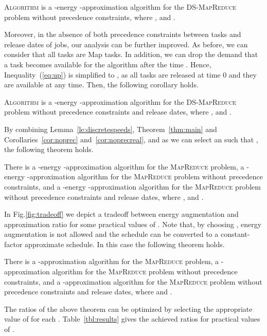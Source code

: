 \documentclass{llncs}
\newcommand{\mr}{\textsc{MapReduce}\xspace}
\newcommand{\dmr}{\textsc{DS-MapReduce}\xspace}
\newcommand{\algomr}{\textsc{Algorithm} \xspace}
\begin{document}
\begin{corollary} \label{cor:noprec}
\algomr is a -energy -approximation algorithm for the \dmr problem without precedence constraints,
where ,  and .
\end{corollary}

Moreover, in the absence of both precedence constraints between tasks and release dates of jobs, our analysis can be further improved.
As before, we can consider that all tasks are Map tasks.
In addition, we can drop the demand that a task  becomes available for the algorithm after the time .
Hence, Inequality~(\ref{eq:up}) is simplified to ,
as all tasks are released at time 0 and they are available at any time.
Then, the following corollary holds.

\begin{corollary} \label{cor:noprecreal}
\algomr is a -energy -approximation algorithm
for the \dmr problem without precedence constraints and release dates,
where ,  and .
\end{corollary}

By combining Lemma~\ref{le:discretespeeds}, Theorem~\ref{thm:main} and Corollaries~\ref{cor:noprec} and~\ref{cor:noprecreal},
and as we can select an  such that , the following theorem holds.

\begin{theorem}
There is a -energy -approximation algorithm for the \mr problem,
a -energy -approximation algorithm for the \mr problem without precedence constraints,
and a -energy -approximation algorithm for the \mr problem without precedence constraints and release dates,
where ,  and .
\end{theorem}

In Fig.\ref{fig:tradeoff} we depict a tradeoff between energy augmentation and approximation ratio for some practical values of .
Note that, by choosing , energy augmentation is not allowed and the schedule can be converted to a constant-factor approximate schedule.
In this case the following theorem holds.

\begin{theorem}
There is a -approximation algorithm for the \mr problem,
a -approximation algorithm for the \mr problem without precedence constraints,
and a -approximation algorithm for the \mr problem without precedence constraints and release dates,
where  and .
\end{theorem}

The ratios of the above theorem can be optimized by selecting the appropriate value of  for each .
Table~\ref{tbl:results} gives the achieved ratios for practical values of .
\end{document}
